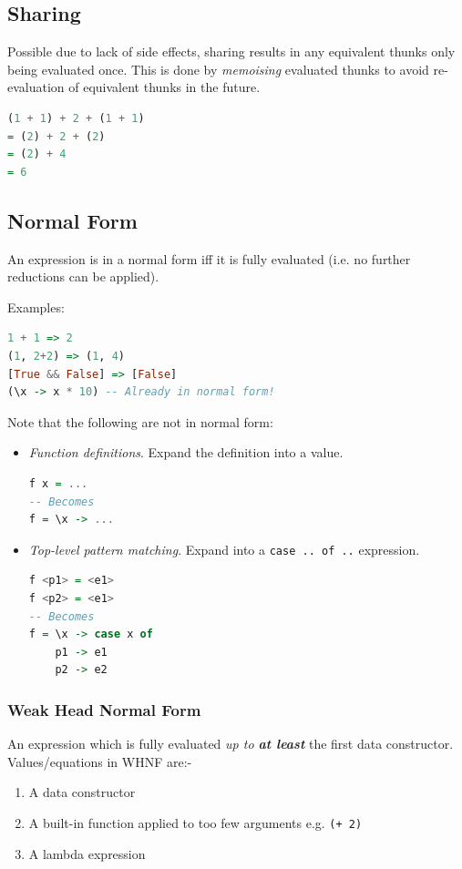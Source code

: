 \subsection{Sharing}
Possible due to lack of side effects, sharing results in any equivalent thunks only being evaluated once. This is done by \textit{memoising} evaluated thunks to avoid re-evaluation of equivalent thunks in the future.

\begin{lstlisting}[language=haskell]
(1 + 1) + 2 + (1 + 1)
= (2) + 2 + (2)
= (2) + 4
= 6
\end{lstlisting}

\subsection{Normal Form}
An expression is in a normal form iff it is fully evaluated (i.e. no further reductions can be applied).

Examples:
\begin{lstlisting}[language=haskell]
1 + 1 => 2
(1, 2+2) => (1, 4)
[True && False] => [False]
(\x -> x * 10) -- Already in normal form!
\end{lstlisting}

Note that the following are not in normal form:
\begin{itemize}
  \item \textit{Function definitions}. Expand the definition into a value.
  \begin{lstlisting}[language=haskell]
f x = ...
-- Becomes
f = \x -> ...\end{lstlisting}
  \item \textit{Top-level pattern matching}. Expand into a \texttt{case .. of ..} expression.
  \begin{lstlisting}[language=haskell]
f <p1> = <e1>
f <p2> = <e1>
-- Becomes
f = \x -> case x of
    p1 -> e1
    p2 -> e2
\end{lstlisting}
\end{itemize}

\subsubsection{Weak Head Normal Form}
An expression which is fully evaluated \textit{up to \textbf{at least}} the first data constructor. Values/equations in WHNF are:-
\begin{enumerate}
  \item A data constructor
  \item A built-in function applied to too few arguments e.g. \texttt{(+ 2)}
  \item A lambda expression
\end{enumerate}

